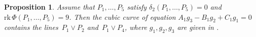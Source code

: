 \documentclass[a4paper, 11pt, reqno]{amsart}
\theoremstyle{plain}
\newtheorem{prop}[lemma]{Proposition}
\theoremstyle{definition}
\newtheorem{rmk}[lemma]{Remark}
\newcommand{\C}{\mathbb{C}}
\newcommand{\rk}{\ensuremath{\mathrm{rk}}}
\begin{document}





\begin{prop}
\label{proposition:G_split}
Assume that $P_1, \dots, P_5 $ satisfy $\delta_2(P_1, \dotsc, P_5) = 0$ and $\rk \, \Phi(P_1, \dotsc, P_5) = 9$. Then the cubic curve
of equation $A_1 g_3 - B_1 g_2 + C_1 g_1=0$ contains the lines~$P_1 \vee P_2$ and~$P_1 \vee P_4$, where $g_1, g_2, g_3$ are given in .
\end{prop}
\end{document}
